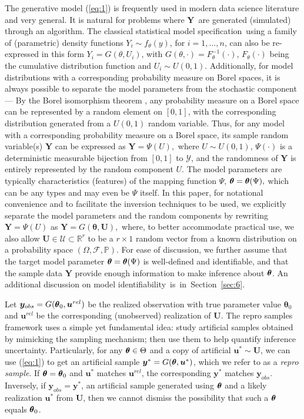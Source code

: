 \documentclass[12pt]{article}
\theoremstyle{shortspace}
\def\*#1{\bm{#1}}
\def\btheta{\mathop{\theta\kern-.45em\hbox{$\theta$}}\nolimits}
\def\P{\mathbb P}
\newcommand{\RR}{\mathbb{R}}
\begin{document}
The generative model  (\ref{eq:1})  is frequently used in modern data science literature  \citep[e.g.,][among others]{dalmasso2022} and very general. It is natural for problems where $\*Y$~are generated 
(simulated) 
through an algorithm. The classical statistical model specification~using a family of (parametric)
density functions $Y_i \sim f_\theta(y)$,  for $i = 1, \ldots, n$, can also be re-expressed in this form $Y_i = G(\theta, U_i)$, with $G(\theta, \cdot) = F_\theta^{-1}(\cdot)$, $F_\theta(\cdot)$ being the cumulative distribution function  and $U_i \sim U(0,1)$. 
Additionally, for model distributions with a corresponding
probability measure on Borel spaces, it is always possible to separate the model parameters from the stochastic component --- By the Borel isomorphism theorem \cite[][Theorem 4.19]{kallenberg1997foundations}, any probability measure on a Borel space can be represented by a random element on $[0,1]$, with the corresponding distribution generated from a $U(0,1)$ random variable. Thus, for any model with a corresponding probability measure
on a Borel space, its sample random variable(s) $\*Y$  can be expressed as  
$
\*Y = \Psi(U),
$  
where $U \sim U(0,1)$,   $\Psi(\cdot)$ is a deterministic measurable bijection from $[0,1]$ to $\mathcal{Y}$, and the randomness of $\*Y$ is entirely represented by the random component $U$. The model parameters  are typically  characteristics (features) of the mapping function $\Psi$,  
$
\btheta = \btheta(\Psi),
$ 
which can be any types and may even be $\Psi$ itself.
In this paper, for notational convenience and to facilitate %
the inversion techniques to be used, we explicitly separate the model parameters and the random components by rewriting $\*Y = \Psi(U)$ as  
$
 \*Y = G(\mathbf{\theta}, \*U),
$  
where, to better accommodate practical use, we also allow $\*U  \in {\mathcal U} \subset \RR^r$ to be a $r \times 1$ random vector from a known distribution 
on a probability space $(\Omega, {\mathcal F}, \P)$. 
For ease of discussion, we further assume that the target model parameter $\btheta = \btheta(\Psi)$ is well-defined and identifiable, and that the sample data $\*Y$ provide enough information to make inference about $\btheta$. An additional discussion on model identifiability~is~in~Section~\ref{sec:6}.  



Let  
$\*y_{obs} = G({\btheta}_0, \*u^{rel})$
be the realized observation with true parameter value $\*\theta_0$ and 
$\*u^{rel}$ be the corresponding (unobserved) 
realization of $\*U$. 
The repro samples framework
uses a simple yet fundamental idea: study  artificial samples 
obtained by mimicking the sampling mechanism; 
then use
them to help
quantify inference uncertainty.
Particularly, 
for any $\btheta \in \Theta$ and 
a copy of artificial  $\*u^* \sim \*U$, we can use 
(\ref{eq:1}) to get 
an artificial sample $\*y^* = G({\btheta}, \*u^*)$, 
which we refer to as a {\it repro sample}.
If $\btheta = \btheta_0$ and $\*u^*$ matches $\*u^{rel}$, the corresponding $\*y^*$  matches $\*y_{obs}$.
Inversely, 
if $\*y_{obs} = \*y^*$,  an artificial sample generated using $\btheta$ and a likely  realization $\*u^*$ from $\*U$, 
then we cannot dismiss the possibility that such a $\btheta$ equals $\btheta_0$. 
\end{document}

